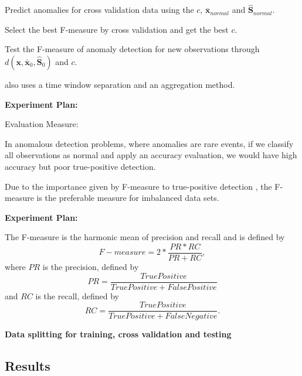 \documentclass[review]{elsarticle}
\begin{document}
Predict anomalies for cross validation data using the $c$, $\boldsymbol{\bar{x}}_{normal}$ and $\boldsymbol{\hat{S}}_{normal}$.

Select the best F-measure by cross validation and get the best $c$.

Test the F-measure of anomaly detection for new observations through $d(\boldsymbol{x},\bar{\boldsymbol{x}}_0, \boldsymbol{\hat{S}}_0)$ and $c$.

\cite{garcia2014empirical} also uses a time window separation and an aggregation method.

\textbf{Experiment Plan:}

Evaluation Measure:

In anomalous detection problems, where anomalies are rare events, if we classify all observations as normal and apply an accuracy evaluation, we would have high accuracy but poor true-positive detection.

Due to the importance given by F-measure to true-positive detection \cite{powers2011evaluation,moustafa2019holistic}, the F-measure is the preferable measure for imbalanced data sets.

\textbf{Experiment Plan:}

	The F-measure is the harmonic mean of precision and recall and is defined by 
	\begin{equation}\label{eq:eq10}
		F-measure = 2 * \frac{PR * RC}{PR + RC},				
	\end{equation}
	where $PR$ is the precision, defined by 
	\begin{equation}\label{eq:eq11}
		PR = \frac{True Positive}{True Positive + False Positive}
	\end{equation}
	and $RC$ is the recall, defined by 
	\begin{equation}\label{eq:eq12}
		RC = \frac{True Positive}{True Positive + False Negative}.
	\end{equation}

\textbf{Data splitting for training, cross validation and testing}


\subsection{Results}
\label{sec:results}
\end{document}
